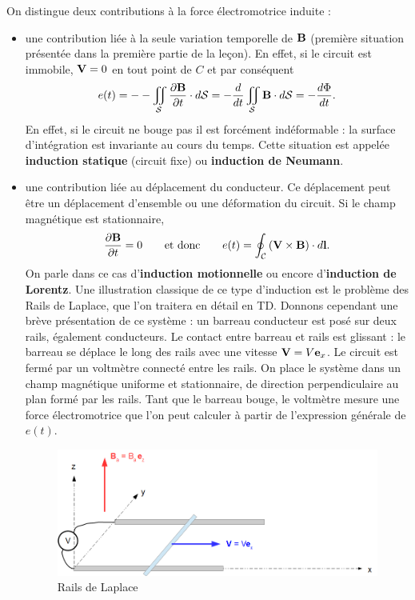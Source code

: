 \documentclass[11pt,a4paper]{report}
\begin{document}
	On distingue deux contributions à la force électromotrice induite :
	\begin{itemize}
		\item une contribution liée à la seule variation temporelle de $\bold{B}$ (première situation présentée dans la première partie de la leçon). En effet, si le circuit est immobile, 
		$\bold{V} = 0$ en tout point de $C$ et par conséquent
		\begin{equation}
			e(t) = - - \iint_\mathcal{S}\frac{\partial\bold{B}}{\partial t}\cdot d\mathcal{S} = - \frac{d}{dt}\iint_\mathcal{S}\bold{B}\cdot d\mathcal{S} = - \frac{d\Phi}{dt}.
		\end{equation}
		En effet, si le circuit ne bouge pas il est forcément indéformable : la surface d'intégration est invariante au cours du temps.
		Cette situation est appelée \textbf{induction statique} (circuit fixe) ou \textbf{induction de Neumann}.
		
		\item une contribution liée au déplacement du conducteur. Ce déplacement peut être un déplacement d'ensemble ou une déformation du circuit. Si le champ magnétique est stationnaire,
			\begin{equation}
				\frac{\partial \bold{B}}{\partial t} = 0 \qquad \text{et donc} \qquad e(t) = \oint_\mathcal{C}\left(\bold{V}\times\bold{B}\right)\cdot d\bold{l}.
			\end{equation}
		On parle dans ce cas d'\textbf{induction motionnelle} ou encore d'\textbf{induction de Lorentz}. Une illustration classique de ce type d'induction est le problème des Rails de 				Laplace, que l'on traitera en détail en TD. Donnons cependant une brève présentation de ce système : un barreau conducteur est posé sur deux rails, également conducteurs. Le contact 			entre barreau et rails est glissant : le barreau se déplace le long des rails avec une vitesse $\bold{V} = V \bold{e}_x$. Le circuit est fermé par un voltmètre connecté entre les 				rails. On place le système dans un champ magnétique uniforme et stationnaire, de direction perpendiculaire au plan formé par les rails. Tant que le barreau bouge, le voltmètre mesure 		une force électromotrice que l'on peut calculer à partir de l'expression générale de $e(t)$. 
		\begin{figure}[h!]
		\begin{center}
			\includegraphics[scale = 0.4]{rails_Laplace.png}
			\caption{Rails de Laplace} 
			\label{fig:rails_Laplace}
		\end{center}
		\end{figure}
	\end{itemize}
	
\end{document}
